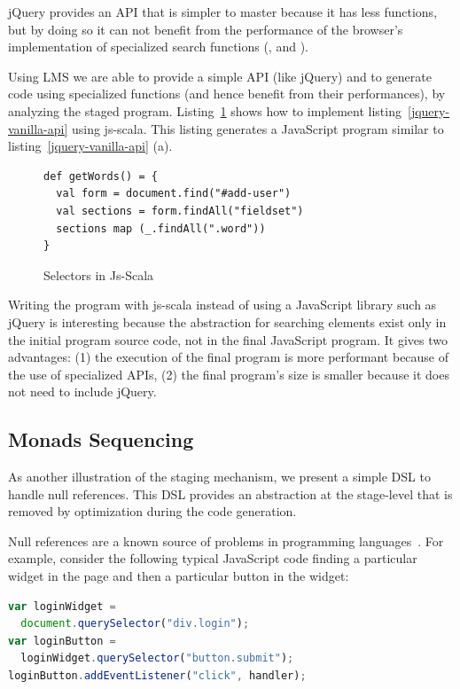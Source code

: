 \documentclass[preprint]{sigplanconf}
\begin{document}
jQuery provides an API that is simpler to master because it has less functions, but by doing so it can not benefit
from the performance of the browser’s implementation of specialized search functions (,
 and ).

Using LMS we are able to provide a simple API (like jQuery) and to generate code using specialized functions (and
hence benefit from their performances), by analyzing the staged program. Listing~\ref{js-scala-selectors} shows how
to implement listing~\ref{jquery-vanilla-api} using js-scala. This listing generates a JavaScript program similar to
listing~\ref{jquery-vanilla-api} (a).

\begin{figure}
\label{js-scala-selectors}
\begin{lstlisting}
def getWords() = {
  val form = document.find("#add-user")
  val sections = form.findAll("fieldset")
  sections map (_.findAll(".word"))
}
\end{lstlisting}
\caption{Selectors in Js-Scala}
\end{figure}

Writing the program with js-scala instead of using a JavaScript library such as jQuery is interesting because the
abstraction for searching elements exist only in the initial program source code, not in the final JavaScript
program. It gives two advantages: (1) the execution of the final program is more performant because of the use of
specialized APIs, (2) the final program’s size is smaller because it does not need to include jQuery.

\subsection{Monads Sequencing}

As another illustration of the staging mechanism, we present a simple DSL to handle null references. This DSL
provides an abstraction at the stage-level that is removed by optimization during the code generation.

Null references are a known source of problems in programming languages~\cite{Hoare09_Null,Nanda09_Null}. For
example, consider the following typical JavaScript code finding a particular widget in the page and then a particular
button in the widget:

\begin{lstlisting}[language=JavaScript,label=null-unsafe,caption=Unsafe code]
var loginWidget =
  document.querySelector("div.login");
var loginButton =
  loginWidget.querySelector("button.submit");
loginButton.addEventListener("click", handler);
\end{lstlisting}
\end{document}
